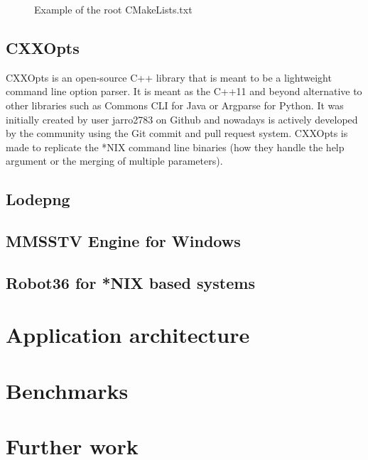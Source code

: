 \begin{multicols*}{2}
\begin{figure}[H]
    \centering
    \inputminted[fontsize=\scriptsize,label=test]{cmake}{file_examples/CMakeLists.txt}
    \caption{Example of the root CMakeLists.txt}
    \label{cmakelists_example}
\end{figure}


\subsection{CXXOpts}
CXXOpts is an open-source C++ library that is meant to be a lightweight command line option parser\cite{cxxopts-github}. It is meant as the C++11 and beyond alternative to other libraries such as Commons CLI for Java or Argparse for Python. It was initially created by user jarro2783 on Github and nowadays is actively developed by the community using the Git commit and pull request system. CXXOpts is made to replicate the *NIX command line binaries (how they handle the help argument or the merging of multiple parameters).
\subsection{Lodepng}
\subsection{MMSSTV Engine for Windows}
\subsection{Robot36 for *NIX based systems}

\section{Application architecture}

\section{Benchmarks}

\section{Further work}
\end{multicols*}
